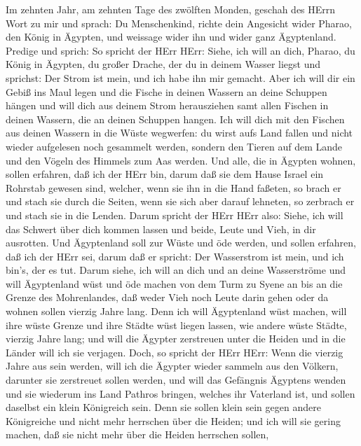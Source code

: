  Im zehnten Jahr, am zehnten Tage des zwölften Monden,
geschah des HErrn Wort zu mir und sprach:  Du Menschenkind,
richte dein Angesicht wider Pharao, den König in Ägypten, und weissage
wider ihn und wider ganz Ägyptenland.  Predige und sprich:
So spricht der HErr HErr: Siehe, ich will an dich, Pharao, du König in
Ägypten, du großer Drache, der du in deinem Wasser liegst und sprichst:
Der Strom ist mein, und ich habe ihn mir gemacht.  Aber ich
will dir ein Gebiß ins Maul legen und die Fische in deinen Wassern an
deine Schuppen hängen und will dich aus deinem Strom herausziehen samt
allen Fischen in deinen Wassern, die an deinen Schuppen hangen.
 Ich will dich mit den Fischen aus deinen Wassern in die
Wüste wegwerfen: du wirst aufs Land fallen und nicht wieder aufgelesen
noch gesammelt werden, sondern den Tieren auf dem Lande und den Vögeln
des Himmels zum Aas werden.  Und alle, die in Ägypten
wohnen, sollen erfahren, daß ich der HErr bin, darum daß sie dem Hause
Israel ein Rohrstab gewesen sind,  welcher, wenn sie ihn in
die Hand faßeten, so brach er und stach sie durch die Seiten, wenn sie
sich aber darauf lehneten, so zerbrach er und stach sie in die Lenden.
 Darum spricht der HErr HErr also: Siehe, ich will das
Schwert über dich kommen lassen und beide, Leute und Vieh, in dir
ausrotten.  Und Ägyptenland soll zur Wüste und öde werden,
und sollen erfahren, daß ich der HErr sei, darum daß er spricht: Der
Wasserstrom ist mein, und ich bin's, der es tut.  Darum
siehe, ich will an dich und an deine Wasserströme und will Ägyptenland
wüst und öde machen von dem Turm zu Syene an bis an die Grenze des
Mohrenlandes,  daß weder Vieh noch Leute darin gehen oder
da wohnen sollen vierzig Jahre lang.  Denn ich will
Ägyptenland wüst machen, will ihre wüste Grenze und ihre Städte wüst
liegen lassen, wie andere wüste Städte, vierzig Jahre lang; und will die
Ägypter zerstreuen unter die Heiden und in die Länder will ich sie
verjagen.  Doch, so spricht der HErr HErr: Wenn die vierzig
Jahre aus sein werden, will ich die Ägypter wieder sammeln aus den
Völkern, darunter sie zerstreuet sollen werden,  und will
das Gefängnis Ägyptens wenden und sie wiederum ins Land Pathros bringen,
welches ihr Vaterland ist, und sollen daselbst ein klein Königreich
sein.  Denn sie sollen klein sein gegen andere Königreiche
und nicht mehr herrschen über die Heiden; und ich will sie gering
machen, daß sie nicht mehr über die Heiden herrschen sollen,
